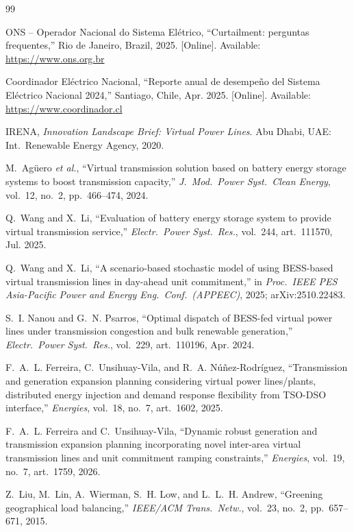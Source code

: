 \documentclass[conference]{IEEEtran}
\begin{document}
\begin{thebibliography}{99}
\footnotesize

 ONS -- Operador Nacional do Sistema El\'etrico, ``Curtailment: perguntas frequentes,'' Rio de Janeiro, Brazil, 2025. [Online]. Available: \url{https://www.ons.org.br}

 Coordinador El\'ectrico Nacional, ``Reporte anual de desempe\~no del Sistema El\'ectrico Nacional 2024,'' Santiago, Chile, Apr. 2025. [Online]. Available: \url{https://www.coordinador.cl}

 IRENA, \emph{Innovation Landscape Brief: Virtual Power Lines}. Abu Dhabi, UAE: Int.\ Renewable Energy Agency, 2020.

 M.~Ag\"uero \emph{et al.}, ``Virtual transmission solution based on battery energy storage systems to boost transmission capacity,'' \emph{J.\ Mod.\ Power Syst.\ Clean Energy}, vol.~12, no.~2, pp.~466--474, 2024.

 Q.~Wang and X.~Li, ``Evaluation of battery energy storage system to provide virtual transmission service,'' \emph{Electr.\ Power Syst.\ Res.}, vol.~244, art.~111570, Jul. 2025.

 Q.~Wang and X.~Li, ``A scenario-based stochastic model of using BESS-based virtual transmission lines in day-ahead unit commitment,'' in \emph{Proc.\ IEEE PES Asia-Pacific Power and Energy Eng.\ Conf.\ (APPEEC)}, 2025; arXiv:2510.22483.

 S.~I. Nanou and G.~N. Psarros, ``Optimal dispatch of BESS-fed virtual power lines under transmission congestion and bulk renewable generation,'' \emph{Electr.\ Power Syst.\ Res.}, vol.~229, art.~110196, Apr. 2024.

 F.~A.~L. Ferreira, C.~Unsihuay-Vila, and R.~A. N\'u\~nez-Rodr\'iguez, ``Transmission and generation expansion planning considering virtual power lines/plants, distributed energy injection and demand response flexibility from TSO-DSO interface,'' \emph{Energies}, vol.~18, no.~7, art.~1602, 2025.

 F.~A.~L. Ferreira and C.~Unsihuay-Vila, ``Dynamic robust generation and transmission expansion planning incorporating novel inter-area virtual transmission lines and unit commitment ramping constraints,'' \emph{Energies}, vol.~19, no.~7, art.~1759, 2026.

 Z.~Liu, M.~Lin, A.~Wierman, S.~H. Low, and L.~L.~H. Andrew, ``Greening geographical load balancing,'' \emph{IEEE/ACM Trans.\ Netw.}, vol.~23, no.~2, pp.~657--671, 2015.


\end{thebibliography}
\end{document}
